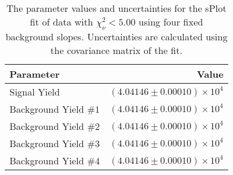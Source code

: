 
\begin{table}[ht]
    \begin{center}
        \begin{tabular}{lr}\toprule
            Parameter & Value \\\midrule
            Signal Yield & $(4.04146 \pm 0.00010) \times 10^{4}$ \\
            Background Yield $\#1$ & $(4.04146 \pm 0.00010) \times 10^{4}$ \\
            Background Yield $\#2$ & $(4.04146 \pm 0.00010) \times 10^{4}$ \\
            Background Yield $\#3$ & $(4.04146 \pm 0.00010) \times 10^{4}$ \\
            Background Yield $\#4$ & $(4.04146 \pm 0.00010) \times 10^{4}$ \\\bottomrule
        \end{tabular}
        \caption{The parameter values and uncertainties for the sPlot fit of data with $\chi^2_\nu < 5.00$ using four fixed background slopes. Uncertainties are calculated using the covariance matrix of the fit.}\label{tab:splot-fit-results-chisqdof-5.00-fixed-4}
    \end{center}
\end{table}
